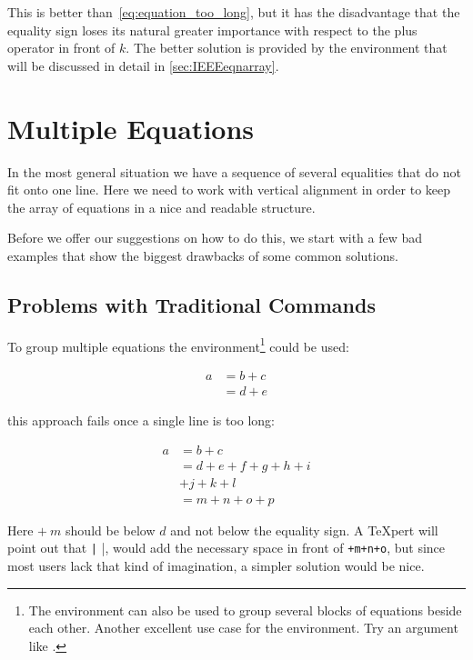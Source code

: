 This is better than~\eqref{eq:equation_too_long}, but
it has the disadvantage that the equality sign loses its natural
greater importance with respect to the plus operator in front of
$k$. The better solution is provided by the
 environment that will be discussed in detail in
\autoref{sec:IEEEeqnarray}.

\section{Multiple Equations}%
\label{sec:IEEEeqnarray}

In the most general situation we have a sequence of several
equalities that do not fit onto one line. Here we need to work with
vertical alignment in order to keep the array of equations in a nice
and readable structure.

Before we offer our suggestions on how to do this, we start with a few
bad examples that show the biggest drawbacks of some common solutions.

\subsection{Problems with Traditional Commands}%
\label{sec:problems_traditional}

To group multiple equations the
 environment\footnote{The  environment can
  also be used to group several blocks of equations beside each other.
  Another excellent use case for the
   environment. Try an argument like
  .} could be used:
\begin{example}
\begin{align}
  a & = b + c \\
  & = d + e
\end{align}
\end{example}
this approach fails once a single line is too long:
\begin{example}
\begin{align}
  a & = b + c \\
  & = d + e + f
  + g + h + i \nonumber \\
  & + j + k + l \\
  & = m + n + o + p
\end{align}
\end{example}
Here $+\:m$ should be below $d$ and not below the equality sign. A
\TeX{}pert will point out that \texttt|\mathrel{\phantom{=}} \negmedspace{}|,
would add the necessary space in front of \verb|+m+n+o|, but since most users
lack that kind of imagination, a simpler solution would be nice.

